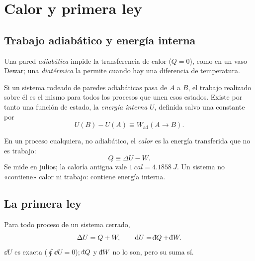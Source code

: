\section{Calor y primera ley}\label{sec:primera}

\subsection{Trabajo adiabático y energía interna}

\begin{definicion}
Una pared \emph{adiabática} impide la transferencia de calor ($Q=0$), como en un vaso Dewar; una
\emph{diatérmica} la permite cuando hay una diferencia de temperatura.
\end{definicion}

\begin{teorema}
Si un sistema rodeado de paredes adiabáticas pasa de $A$ a $B$, el trabajo realizado sobre él es el mismo
para todos los procesos que unen esos estados. Existe por tanto una función de estado, la
\emph{energía interna} $U$, definida salvo una constante por
\begin{equation}\label{eq:Uad}
  U(B)-U(A)\equiv W_{\mathrm{ad}}(A\to B).
\end{equation}
\end{teorema}

\begin{definicion}[Calor]
En un proceso cualquiera, no adiabático, el \emph{calor} es la energía transferida que no es trabajo:
\begin{equation}\label{eq:Qdef}
  Q\equiv\Delta U-W .
\end{equation}
Se mide en julios; la caloría antigua vale $\SI{1}{cal}=\SI{4,1858}{J}$. Un sistema no «contiene» calor ni
trabajo: contiene energía interna.
\end{definicion}

\subsection{La primera ley}

\begin{teorema}
Para todo proceso de un sistema cerrado,
\begin{equation}\label{eq:primera}
  \Delta U=Q+W,\qquad \dd U=\dbar Q+\dbar W .
\end{equation}
$\dd U$ es exacta ($\oint\dd U=0$); $\dbar Q$ y $\dbar W$ no lo son, pero su suma sí.
\end{teorema}

